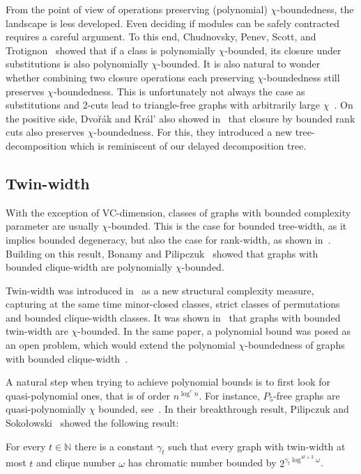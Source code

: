 \documentclass[11pt]{article}
\numberwithin{equation}{section}
\newcommand{\pcb}{polynomially $\chi$-bounded}
\begin{document}
From the point of view of operations preserving (polynomial) $\chi$-boundedness, the landscape is less developed. Even deciding if modules can be safely contracted requires a careful argument. To this end,
Chudnovsky, Penev, Scott, and Trotignon~\cite{CPST13} showed that if a class is \pcb, its closure under substitutions is also \pcb. It is also natural to wonder whether combining two closure operations each preserving $\chi$-boundedness still preserves $\chi$-boundedness. This is unfortunately not always the case as substitutions and 2-cuts lead to triangle-free graphs with arbitrarily large $\chi$~\cite{BBDGT23}. On the positive side, Dvo\v{r}\'ak and  Kr\'al’ also showed in~\cite{DK12} that closure by bounded rank cuts also  preserves $\chi$-boundedness. For this, they introduced a new tree-decomposition which is reminiscent of our delayed decomposition tree.

\subsection{Twin-width}
With the exception of VC-dimension, classes of graphs with bounded complexity parameter are usually $\chi$-bounded. This is the case for bounded tree-width, as it implies bounded degeneracy, but also the case for rank-width, as shown in~\cite{DK12}. Building on this result,
Bonamy and Pilipczuk~\cite{BP19} showed that graphs with bounded clique-width are \pcb.

Twin-width was introduced in~\cite{BKTW21} as a new structural complexity measure, capturing at the same time minor-closed classes, strict classes of permutations and bounded clique-width classes.
It was shown in~\cite{BGKTW21} that graphs with bounded twin-width are $\chi$-bounded. In the same paper, a polynomial bound was posed as an open problem, which would extend the polynomial $\chi$-boundedness of graphs with bounded clique-width~\cite{BP19}.


A natural step when trying to achieve polynomial bounds is to first look for quasi-polynomial ones, that is of order $n^{\log^c n}$. For instance, $P_5$-free graphs are quasi-polynomially $\chi$ bounded, see~\cite{SSS22}. In their breakthrough result, Pilipczuk and Soko\l{}owski~\cite{PS22} showed the following result:

\begin{theorem}\label{th:PS}
For every $t \in \mathbb{N}$ there is a constant $\gamma_t$ such that every graph with twin-width at most $t$ and clique number $\omega$ has chromatic number bounded by $2^{\gamma_t \log^{4t+3}\omega}$.
\end{theorem}
\end{document}
